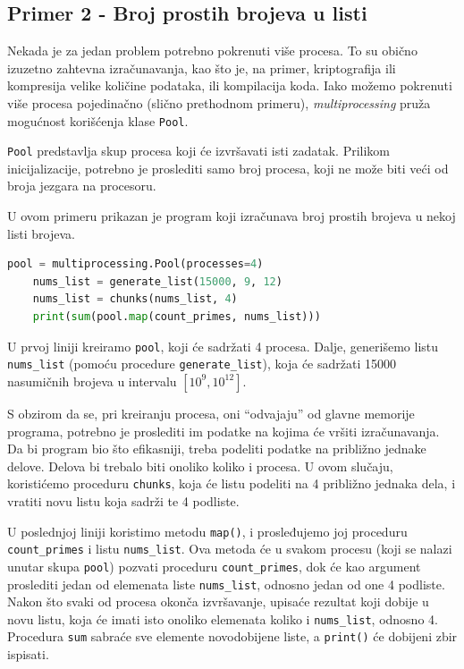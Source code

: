 \documentclass[a4paper]{article}
\begin{document}
    \subsection{Primer 2 - Broj prostih brojeva u listi}
    Nekada je za jedan problem potrebno pokrenuti više procesa. To su obično izuzetno zahtevna izračunavanja, kao što je, na primer, kriptografija ili kompresija velike količine podataka, ili kompilacija koda. Iako možemo pokrenuti više procesa pojedinačno (slično prethodnom primeru), \emph{multiprocessing} pruža mogućnost korišćenja klase \lstinline{Pool}. 
    \par \lstinline{Pool} predstavlja skup procesa koji će izvršavati isti zadatak. Prilikom inicijalizacije, potrebno je proslediti samo broj procesa, koji ne može biti veći od broja jezgara na procesoru.
    \par U ovom primeru prikazan je program koji izračunava broj prostih brojeva u nekoj listi brojeva.
    \begin{lstlisting}[showstringspaces=false, language=Python]
    pool = multiprocessing.Pool(processes=4)
    nums_list = generate_list(15000, 9, 12)
    nums_list = chunks(nums_list, 4)
    print(sum(pool.map(count_primes, nums_list)))
    \end{lstlisting}
    \par U prvoj liniji kreiramo \lstinline{pool}, koji će sadržati 4 procesa.
    Dalje, generišemo listu \lstinline{nums_list} (pomoću procedure \lstinline{generate_list}), koja će sadržati 15000 nasumičnih brojeva u intervalu $\left [ 10^{9}, 10^{12} \right ]$. 
    \par S obzirom da se, pri kreiranju procesa, oni ``odvajaju'' od glavne memorije programa, potrebno je proslediti im podatke na kojima će vršiti izračunavanja. Da bi program bio što efikasniji, treba podeliti podatke na približno jednake delove. Delova bi trebalo biti onoliko koliko i procesa.
    U ovom slučaju, koristićemo proceduru \lstinline{chunks}, koja će listu podeliti na 4 približno jednaka dela, i vratiti novu listu koja sadrži te 4 podliste.
    \par U poslednjoj liniji koristimo metodu \lstinline{map()}, i prosleđujemo joj proceduru \lstinline{count_primes} i listu \lstinline{nums_list}. Ova metoda će u svakom procesu (koji se nalazi unutar skupa \lstinline{pool}) pozvati proceduru \lstinline{count_primes}, dok će kao argument proslediti jedan od elemenata liste \lstinline{nums_list}, odnosno jedan od one 4 podliste. Nakon što svaki od procesa okonča izvršavanje, upisaće rezultat koji dobije u novu listu, koja će imati isto onoliko elemenata koliko i \lstinline{nums_list}, odnosno 4. Procedura \lstinline{sum} sabraće sve elemente novodobijene liste, a \lstinline{print()} će dobijeni zbir ispisati.
\end{document}
